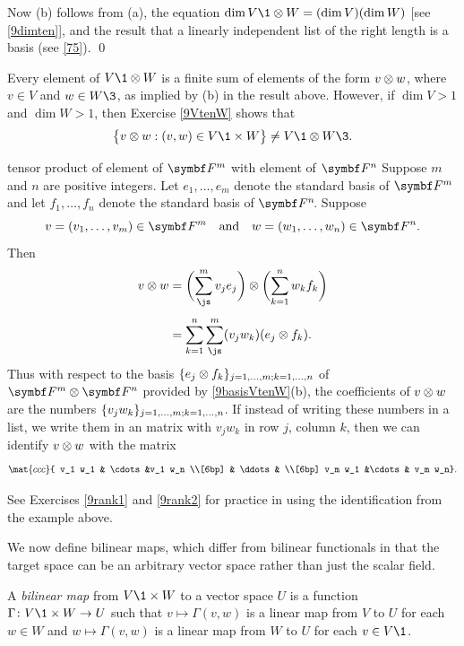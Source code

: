 Now (b) follows from (a), the equation $\dim V\1 \tensor W = (\dim V)(\dim W)$ [see \ref{9dimten}], and the result that a linearly independent list of the right length is a basis (see \ref{75}).
\qed

Every element of $V\1 \tensor W$ is a finite sum of elements of the form
$v \otimes w$, where $v \in V$ and $w \in W\3$, as implied by (b) in the result above. However, if $\dim V > 1$ and $\dim W > 1$, then Exercise \ref{9VtenW} shows that
\vspace{-.03in} %
\[
\br[\big]{ v \tensor w : (v, w) \in V\1 \times W } \ne V\1 \tensor W\3.
\]

\pagebreak[3]

\begin{example}[9FmFn]{tensor product of element of\/ $\F m$ with element of\/ $\F n$ }
Suppose $m$ and $n$ are positive integers. Let $e_1, \ldots, e_m$ denote the standard basis of $\F m$ and let $f_1, \ldots, f_n$ denote the standard basis of $\FF n$. Suppose
\[
v = (v_1, \ldots, v_m) \in \F m \andd w = (w_1, \ldots, w_n) \in \F n.
\]
Then
\begin{align*}
v \tensor w &= \paren[\bigg]{ \sum_{\js}^m v_j e_j } \tensor \paren[\bigg]{ \sum_{k=1}^n w_k f_k } \\[4bp]
&= \sum_{k=1}^n \sum_{\js}^m (v_j w_k) ( e_j \tensor f_k ).
\end{align*}
Thus with respect to the basis $\{e_j \otimes f_k\}_{j = 1, \ldots, m; k = 1, \ldots, n}$ of $\F m \tensor \F n$ provided by \ref{9basisVtenW}(b), the coefficients of $v \otimes w$ are the numbers $\{v_j w_k\}_{j = 1, \ldots, m; k = 1, \ldots, n}$. If instead of writing these numbers in a list, we write them in an  matrix with $v_j w_k$ in row $j$, column $k$, then we can identify $v \otimes w$ with the  matrix
\[
\mat{ccc}{
v_1 w_1 & \cdots &v_1 w_n \\[6bp]
& \ddots & \\[6bp]
v_m w_1 &\cdots & v_m w_n}.
\]
\end{example}

See Exercises \ref{9rank1} and \ref{9rank2} for practice in using the identification from the example above.

We now define bilinear maps, which differ from bilinear functionals in that the target space can be an arbitrary vector space rather than just the scalar field.

{A \emph{bilinear map} from $V\1 \times W$ to a vector space $U$ is a function $\fun \Gamma {V\1 \times W} U$ such that
$v \mapsto \Gamma(v, w)$ is a linear map from $V$ to $U$ for each $w\in W$ and
$w \mapsto \Gamma(v, w)$ is a linear map from $W$ to $U$ for each $v \in V\1$.}

